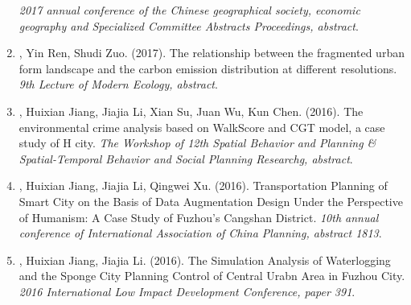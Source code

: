 \begin{enumerate}
    \textit{2017 annual conference of the Chinese geographical society, economic geography and Specialized Committee Abstracts Proceedings, abstract}.
\item
    \Shaoqing, Yin Ren, Shudi Zuo. (2017).
    The relationship between the fragmented urban form landscape and the carbon emission distribution at different resolutions.
    \textit{9th Lecture of Modern Ecology, abstract}.
\item
    \Shaoqing, Huixian Jiang, Jiajia Li, Xian Su, Juan Wu, Kun Chen. (2016).
    The environmental crime analysis based on WalkScore and CGT model, a case study of H city.
    \textit{The Workshop of 12th Spatial Behavior and Planning \& Spatial-Temporal Behavior and Social Planning Researchg, abstract}.
\item
    \Shaoqing, Huixian Jiang, Jiajia Li, Qingwei Xu. (2016).
    Transportation Planning of Smart City on the Basis of Data Augmentation Design Under the Perspective of Humanism: A Case Study of Fuzhou's Cangshan District.
    \textit{10th annual conference of International Association of China Planning, abstract 1813}.
\item
    \Shaoqing, Huixian Jiang, Jiajia Li. (2016).
    The Simulation Analysis of Waterlogging and the Sponge City Planning Control of Central Urabn Area in Fuzhou City.
    \textit{2016 International Low Impact Development Conference, paper 391}.
\end{enumerate}